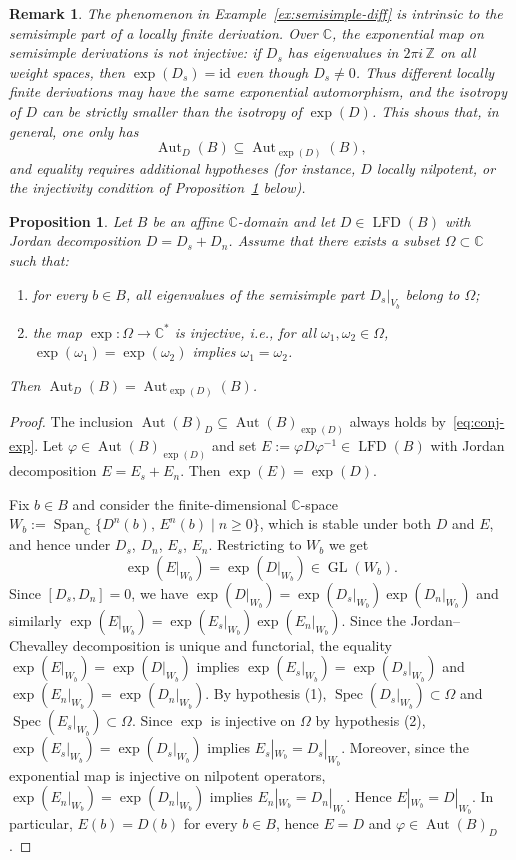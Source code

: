 \documentclass[11pt,a4paper,reqno]{amsart}
\newtheorem{proposition}[theorem]{Proposition}
\newtheorem{remark}[theorem]{Remark}}
\newcommand{\Aut}[0]{\ensuremath{\operatorname{Aut}}}
\begin{document}
\begin{remark}
The phenomenon in Example~\ref{ex:semisimple-diff} is intrinsic to the semisimple part of a locally finite derivation. Over $\mathbb{C}$, the exponential map on semisimple derivations is not injective: if $D_s$ has eigenvalues in $2\pi i\,\mathbb{Z}$ on all weight spaces, then $\exp(D_s)=\mathrm{id}$ even though $D_s\neq 0$. Thus different locally finite derivations may have the same exponential automorphism, and the isotropy of $D$ can be strictly smaller than the isotropy of $\exp(D)$. This shows that, in general, one only has
\[
\Aut_D(B)\subseteq \Aut_{\exp(D)}(B),
\]
and equality requires additional hypotheses (for instance, $D$ locally nilpotent, or the injectivity condition of Proposition~\ref{prop:criterion-equality} below).
\end{remark}
 
\begin{proposition}\label{prop:criterion-equality}
Let $B$ be an affine $\mathbb{C}$-domain and let $D\in\operatorname{LFD}(B)$ with Jordan decomposition $D=D_s+D_n$.
Assume that there exists a subset $\Omega\subset\mathbb{C}$ such that:
\begin{enumerate}
\item for every $b\in B$, all eigenvalues of the semisimple part $D_s|_{V_b}$ belong to $\Omega$;
\item the map $\exp\colon\Omega\to\mathbb{C}^*$ is injective, i.e., for all $\omega_1,\omega_2\in\Omega$, $\exp(\omega_1)=\exp(\omega_2)$ implies $\omega_1=\omega_2$.
\end{enumerate}
Then $\Aut_D(B)=\Aut_{\exp(D)}(B)$.
\end{proposition}
 
\begin{proof}
The inclusion $\Aut(B)_D\subseteq\Aut(B)_{\exp(D)}$ always holds by~\eqref{eq:conj-exp}.
Let $\varphi\in\Aut(B)_{\exp(D)}$ and set $E:=\varphi D\varphi^{-1}\in\operatorname{LFD}(B)$ with Jordan decomposition $E=E_s+E_n$.
Then $\exp(E)=\exp(D)$.
 
Fix $b\in B$ and consider the finite-dimensional $\mathbb{C}$-space
$W_b:=\operatorname{Span}_\mathbb{C}\{D^n(b),\,E^n(b)\mid n\ge0\}$,
which is stable under both $D$ and $E$, and hence under $D_s$, $D_n$, $E_s$, $E_n$. Restricting to $W_b$ we get
\[
\exp(E|_{W_b})=\exp(D|_{W_b})\in\operatorname{GL}(W_b).
\]
Since $[D_s,D_n]=0$, we have $\exp(D|_{W_b})=\exp(D_s|_{W_b})\exp(D_n|_{W_b})$ and similarly $\exp(E|_{W_b})=\exp(E_s|_{W_b})\exp(E_n|_{W_b})$. Since the Jordan--Chevalley decomposition is unique and functorial, the equality $\exp(E|_{W_b})=\exp(D|_{W_b})$ implies $\exp(E_s|_{W_b})=\exp(D_s|_{W_b})$ and $\exp(E_n|_{W_b})=\exp(D_n|_{W_b})$.
By hypothesis (1), $\operatorname{Spec}(D_s|_{W_b})\subset \Omega$ and $\operatorname{Spec}(E_s|_{W_b})\subset \Omega$. Since $\exp$ is injective on $\Omega$ by hypothesis (2), $\exp(E_s|_{W_b})=\exp(D_s|_{W_b})$ implies $E_s|_{W_b}=D_s|_{W_b}$. Moreover, since the exponential map is injective on nilpotent operators, $\exp(E_n|_{W_b})=\exp(D_n|_{W_b})$ implies $E_n|_{W_b}=D_n|_{W_b}$. Hence $E|_{W_b}=D|_{W_b}$.
In particular, $E(b)=D(b)$ for every $b\in B$, hence $E=D$ and $\varphi\in\Aut(B)_D$.
\end{proof}
 
\end{document}
